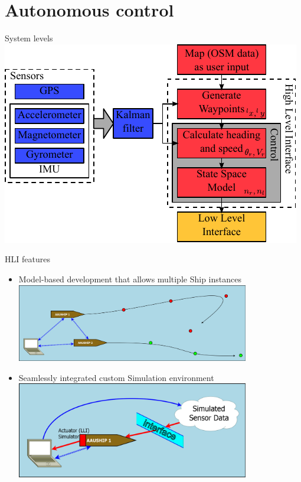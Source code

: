 \section{Autonomous control}
\begin{frame}{System levels}
    \includegraphics[width = \textwidth]{control/img/vessel-block-overview}
\end{frame}

\begin{frame}{HLI features}
		\begin{itemize}
			\item Model-based development that allows multiple Ship instances
			\centering
			\includegraphics[trim = 5mm 5mm 5mm 5mm, clip, width = 0.8\textwidth]{control/img/actor-model}
			\item Seamlessly integrated custom Simulation environment
			\centering
			\includegraphics[trim = 5mm 5mm 5mm 5mm, clip, width = 0.8\textwidth]{control/img/simmodel}
		\end{itemize}
\end{frame}

